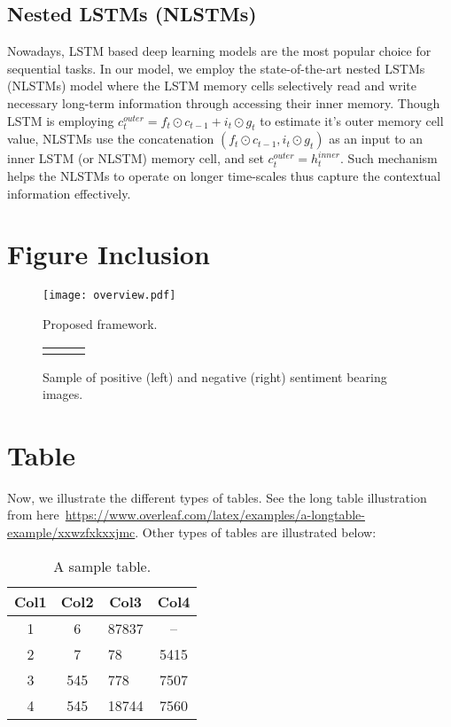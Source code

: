 \documentclass[11pt]{article}
\begin{document}
{%

\subsection{Nested LSTMs (NLSTMs)}
\label{ref:nestedLSTMs}
Nowadays, LSTM based deep learning models are the most popular choice for sequential tasks. In our model, we employ the state-of-the-art nested LSTMs (NLSTMs) model where the LSTM memory cells selectively read and write necessary long-term information through accessing their inner memory. Though LSTM is employing $c_{t}^{outer}={f_{t}}\odot{c_{t-1}}+{i_{t}}\odot{g_{t}}$ to estimate it's outer memory cell value, NLSTMs use the concatenation $({f_{t}}\odot{c_{t-1}},{i_{t}}\odot{g_{t}})$ as an input to an inner LSTM (or NLSTM) memory cell, and set $c_{t}^{outer}=h_{t}^{inner}$. Such mechanism helps the NLSTMs to operate on longer time-scales thus capture the contextual information effectively.


\section{Figure Inclusion}
\label{ref:figure}

\begin{figure}[!htb]
\centering
\texttt{[image: overview.pdf]}
\caption{Proposed framework.}
\label{fig:overview}
\end{figure}


\begin{figure}[!htb]
\centering
\begin{tabular}{cp{0.5cm}c}
&
\end{tabular}
\caption{Sample of positive (left) and negative (right) sentiment bearing images.}
\label{Fig:sampleImage}
\end{figure}

\section{Table}
\label{ref:table}
Now, we illustrate the different types of tables. See the long table illustration from here~\url{https://www.overleaf.com/latex/examples/a-longtable-example/xxwzfxkxxjmc}. Other types of tables are illustrated below:

\begin{table}[!h]
\centering
\caption{A sample table.}
\begin{tabular}{|c|c|l|c|} 
\hline
\textbf{Col1} & \textbf{Col2} & \multicolumn{1}{c|}{\textbf{Col3}} & \textbf{Col4} \\
\hline
1 & 6 & 87837 & --\\ 
\hline
2 & 7 & 78 & 5415 \\
\hline
3 & 545 & 778 & 7507 \\
\hline
4 & 545 & 18744 & 7560 \\
\hline
\end{tabular}
\end{table}


}
\end{document}
